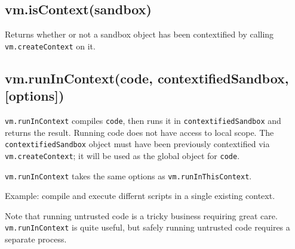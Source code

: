 \subsection{vm.isContext(sandbox)}\label{vm.iscontextsandbox}

Returns whether or not a sandbox object has been contextified by calling
\texttt{vm.createContext} on it.

\subsection{vm.runInContext(code, contextifiedSandbox,
{[}options{]})}\label{vm.runincontextcode-contextifiedsandbox-options}

\texttt{vm.runInContext} compiles \texttt{code}, then runs it in
\texttt{contextifiedSandbox} and returns the result. Running code does
not have access to local scope. The \texttt{contextifiedSandbox} object
must have been previously contextified via \texttt{vm.createContext}; it
will be used as the global object for \texttt{code}.

\texttt{vm.runInContext} takes the same options as
\texttt{vm.runInThisContext}.

Example: compile and execute differnt scripts in a single existing
context.

\begin{Shaded}
\begin{Highlighting}[]
 \NormalTok{(}\NormalTok{);}
 \NormalTok{(}\NormalTok{);}

 \NormalTok{: } \NormalTok{\};}

 \NormalTok{(} 
    \NormalTok{(}
\NormalTok{\}}
\NormalTok{(}

\end{Highlighting}
\end{Shaded}

Note that running untrusted code is a tricky business requiring great
care. \texttt{vm.runInContext} is quite useful, but safely running
untrusted code requires a separate process.


